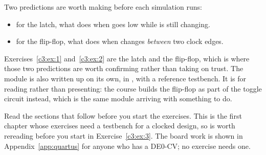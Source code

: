 Two predictions are worth making before each simulation runs:
\begin{itemize}
  \item for the latch, what  does when  goes low while  is still
    changing.
  \item for the flip-flop, what  does when  changes \emph{between} two clock edges.
\end{itemize}
Exercises~\ref{c3:ex:1} and~\ref{c3:ex:2} are the latch and the flip-flop, which is where those two
predictions are worth confirming rather than taking on trust. The module  is also
written up on its own, in , with a reference testbench. It is for reading rather than
presenting: the course builds the flip-flop as part of the toggle circuit instead, which is the same
module arriving with something to do.

Read the sections that follow before you start the exercises. This is the first chapter whose
exercises need a testbench for a clocked design, so  is worth rereading before you
start  in Exercise~\ref{c3:ex:3}. The board work is shown in
Appendix~\ref{app:quartus} for anyone who has a DE0-CV; no exercise needs one.




